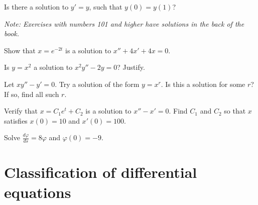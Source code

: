 \documentclass[12pt]{book}
\begin{document}
\begin{exercise}
Is there a solution to $y' = y$, such that $y(0) = y(1)$?
\end{exercise}


\noindent
\emph{Note: Exercises with numbers 101 and higher have solutions in the
back of the book.}


\setcounter{exercise}{100}

\begin{exercise}
Show that $x = e^{-2t}$ is a solution to $x'' + 4x' + 4x = 0$.
\end{exercise}

\begin{exercise}
Is $y = x^2$ a solution to $x^2y'' - 2y = 0$?  Justify.
\end{exercise}

\begin{exercise}
Let $xy'' - y' = 0$.  Try a solution of the form $y = x^r$.  Is this a
solution for some $r$?  If so, find all such $r$.
\end{exercise}


\begin{exercise}
Verify that $x=C_1e^t+C_2$ is a solution to $x''-x' = 0$.  Find $C_1$ and
$C_2$ so that $x$ satisfies $x(0) = 10$ and $x'(0) = 100$.
\end{exercise}

\begin{exercise}
Solve $\frac{d\varphi}{ds} = 8 \varphi$ and $\varphi(0) = -9$.
\end{exercise}


\sectionnewpage
\section{Classification of differential equations}
\label{classification:section}

\end{document}
